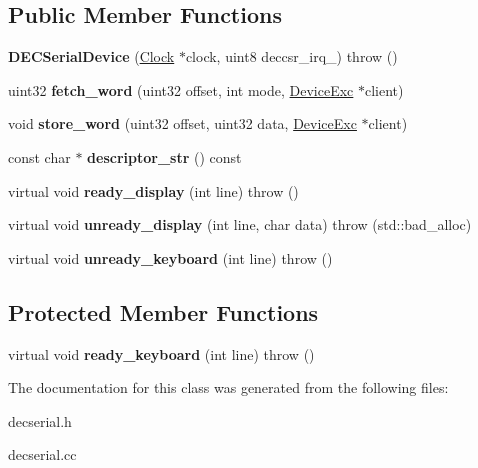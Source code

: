 \subsection*{Public Member Functions}
\begin{DoxyCompactItemize}
\item 
\hypertarget{classDECSerialDevice_a5352f1903bcbb940a9585d6fdf455e70}{
{\bfseries DECSerialDevice} (\hyperlink{classClock}{Clock} $\ast$clock, uint8 deccsr\_\-irq\_\-)  throw ()}
\label{classDECSerialDevice_a5352f1903bcbb940a9585d6fdf455e70}

\item 
\hypertarget{classDECSerialDevice_a7e7121d53a61efb3b7c6a213b68cbe1f}{
uint32 {\bfseries fetch\_\-word} (uint32 offset, int mode, \hyperlink{classDeviceExc}{DeviceExc} $\ast$client)}
\label{classDECSerialDevice_a7e7121d53a61efb3b7c6a213b68cbe1f}

\item 
\hypertarget{classDECSerialDevice_a703cb7f5757a9076f1074d188291617a}{
void {\bfseries store\_\-word} (uint32 offset, uint32 data, \hyperlink{classDeviceExc}{DeviceExc} $\ast$client)}
\label{classDECSerialDevice_a703cb7f5757a9076f1074d188291617a}

\item 
\hypertarget{classDECSerialDevice_a4bafbd9752125c521627528e8b1c5a2b}{
const char $\ast$ {\bfseries descriptor\_\-str} () const }
\label{classDECSerialDevice_a4bafbd9752125c521627528e8b1c5a2b}

\item 
\hypertarget{classDECSerialDevice_a162892d99421099bcc484975eaa52967}{
virtual void {\bfseries ready\_\-display} (int line)  throw ()}
\label{classDECSerialDevice_a162892d99421099bcc484975eaa52967}

\item 
\hypertarget{classDECSerialDevice_a90c514eea4287882eed3e31f2792964b}{
virtual void {\bfseries unready\_\-display} (int line, char data)  throw (std::bad\_\-alloc)}
\label{classDECSerialDevice_a90c514eea4287882eed3e31f2792964b}

\item 
\hypertarget{classDECSerialDevice_a018c7b26ebc09ce1529549f49a5eb4d4}{
virtual void {\bfseries unready\_\-keyboard} (int line)  throw ()}
\label{classDECSerialDevice_a018c7b26ebc09ce1529549f49a5eb4d4}

\end{DoxyCompactItemize}
\subsection*{Protected Member Functions}
\begin{DoxyCompactItemize}
\item 
\hypertarget{classDECSerialDevice_ac2ab83e7f32d9f70f615eaf3c3121e21}{
virtual void {\bfseries ready\_\-keyboard} (int line)  throw ()}
\label{classDECSerialDevice_ac2ab83e7f32d9f70f615eaf3c3121e21}

\end{DoxyCompactItemize}


The documentation for this class was generated from the following files:\begin{DoxyCompactItemize}
\item 
decserial.h\item 
decserial.cc\end{DoxyCompactItemize}

